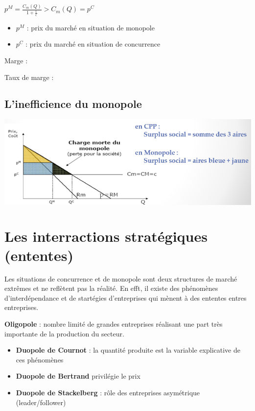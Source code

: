 \begin{center}
    \Large{$p^{M} = \frac{C_{m}(Q)}{1+\frac{1}{\epsilon}} > C_{m}(Q) = p^{C}$}
\end{center}
\begin{itemize}
    \item $p^{M}$ : prix du marché en situation de monopole
    \item $p^{C}$ : prix du marché en situation de concurrence
\end{itemize}
Marge :
\begin{center}
    \Large{}
\end{center}
Taux de marge :
\begin{center}
    \Large{}
\end{center}
\subsection{L'inefficience du monopole}
\begin{center}
    \includegraphics[scale=0.7]{Pics/Inefficience_monopole.png}
\end{center}
\newpage
\section{Les interractions stratégiques (ententes)}
Les situations de concurrence et de monopole sont deux structures de marché extrêmes et ne reflètent pas la réalité. En efft, il existe des phénomènes d'interdépendance et de startégies d'entreprises qui mènent à des ententes entres entreprises. \newline

\textbf{\textcolor{BrickRed}{Oligopole}} : nombre limité de grandes entreprises réalisant une part très importante de la production du secteur.
\newline
\begin{itemize}
    \item \textbf{Duopole de Cournot} : la quantité produite est la variable explicative de ces phénomènes \newline
    \item \textbf{Duopole de Bertrand} privilégie le prix \newline
    \item \textbf{Duopole de Stackelberg} : rôle des entreprises asymétrique (leader/follower)
\end{itemize}
\newpage
